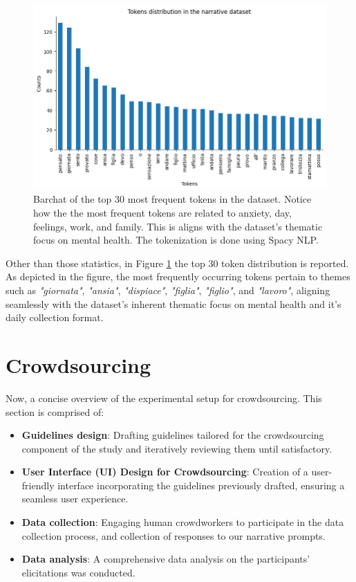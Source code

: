 \begin{figure}[!htbp]
    \centering
    \includegraphics[width=1\linewidth]{assets//imgs/dataset-top-30-prompt.png}
    \caption{Barchat of the top 30 most frequent tokens in the dataset. Notice how the the most frequent tokens are related to anxiety, day, feelings, work, and family. This is aligns with the dataset's thematic focus on mental health. The tokenization is done using Spacy NLP.}
    \label{fig:dataset-top-30-prompt}
\end{figure}

Other than those statistics, in Figure \ref{fig:dataset-top-30-prompt} the top 30 token distribution is reported. As depicted in the figure, the most frequently occurring tokens pertain to themes such as  \emph{"giornata"}, \emph{"ansia"},  \emph{"dispiace"},  \emph{"figlia"},  \emph{"figlio"}, and  \emph{"lavoro"}, aligning seamlessly with the dataset's inherent thematic focus on mental health and it's daily collection format.

\section{Crowdsourcing}
Now, a concise overview of the experimental setup for crowdsourcing. This section is comprised of:
\begin{itemize}
    \item \textbf{Guidelines design}: Drafting guidelines tailored for the crowdsourcing component of the study and iteratively reviewing them until satisfactory.
    \item \textbf{User Interface (UI) Design for Crowdsourcing}: Creation of a user-friendly interface incorporating the guidelines previously drafted, ensuring a seamless user experience.
    \item \textbf{Data collection}: Engaging human crowdworkers to participate in the data collection process, and collection of responses to our narrative prompts.
    \item \textbf{Data analysis}: A comprehensive data analysis on the participants' elicitations was conducted.
\end{itemize}
